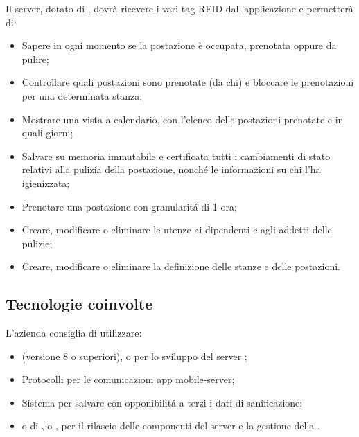 Il server, dotato di , dovrà ricevere i vari tag RFID dall'applicazione e permetterà di:
\begin{itemize}
	\item Sapere in ogni momento se la postazione è occupata, prenotata oppure da pulire;
	\item Controllare quali postazioni sono prenotate (da chi) e bloccare le prenotazioni per una determinata stanza;
	\item Mostrare una vista a calendario, con l’elenco delle postazioni prenotate e in quali giorni;
	\item Salvare su memoria immutabile e certificata tutti i cambiamenti di stato relativi alla pulizia della postazione, nonch\'e le informazioni su chi l'ha igienizzata;
	\item Prenotare una postazione con granularit\'a di 1 ora;
	\item Creare, modificare o eliminare le utenze ai dipendenti e agli addetti delle pulizie;
	\item Creare, modificare o eliminare la definizione delle stanze e delle postazioni.
\end{itemize}

\subsection{Tecnologie coinvolte}
L'azienda consiglia di utilizzare:
\begin{itemize}
\item {} (versione 8 o superiori),  o  per lo sviluppo del server ;
\item Protocolli  per le comunicazioni app mobile-server;
\item Sistema  per salvare con opponibilit\'a a terzi i dati di sanificazione;
\item {} o di ,  o , per il rilascio delle componenti del server e la gestione della .
\end{itemize}

